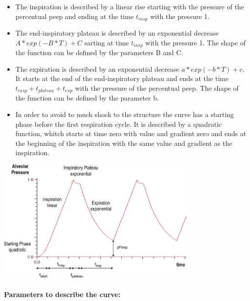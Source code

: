 \begin{itemize}
	\item The inspiration is described by a linear rise starting with the pressure of the percentual peep and ending at the time $t_{insp}$ with the pressure 1.
	\item The end-inspiratory plateau is described by an exponential decrease \linebreak $A*exp(-B*T)+C$ sarting at time $t_{insp}$ with the pressure 1. The shape of the function can be defined by the parameters B and C.
	\item The expiration is described by an exponential decrease $a*exp(-b*T)+c$. It starts at the end of the end-inspiratory plateau and ends at the time $t_{insp}+t_{plateau}+t_{exp}$ with the pressure of the percentual peep. The shape of the function can be defined by the parameter b.
	\item In order to avoid to much shock to the structure the curve has a starting phase before the first respiration cycle. It is described by a quadratic function, whitch starts at time zero with value and gradient zero and ends at the beginning of the inspiration with the same value and gradient as the inspiration.
\end{itemize}
\bigskip \par


\begin{center}
\includegraphics[width=100mm]{figures/PAlveolar}
\end{center}

\paragraph*{Parameters to describe the curve:\\}

